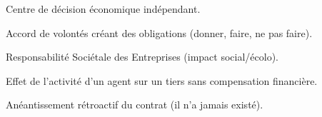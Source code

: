 \documentclass[a4paper,10pt]{article}
\begin{document}
\begin{tcolorbox}[title=LEXIQUE EXPRESS, colback=white, colframe=black]
    \footnotesize
    \begin{description}[style=multiline, leftmargin=3cm]
        \item[\textcolor{mainBlue}{Agent Économique}] Centre de décision économique indépendant.
        \item[\textcolor{mainBlue}{Contrat}] Accord de volontés créant des obligations (donner, faire, ne pas faire).
        \item[\textcolor{mainBlue}{RSE}] Responsabilité Sociétale des Entreprises (impact social/écolo).
        \item[\textcolor{mainBlue}{Externalité}] Effet de l'activité d'un agent sur un tiers sans compensation financière.
        \item[\textcolor{mainBlue}{Nullité}] Anéantissement rétroactif du contrat (il n'a jamais existé).
    \end{description}
\end{tcolorbox}
\end{document}
